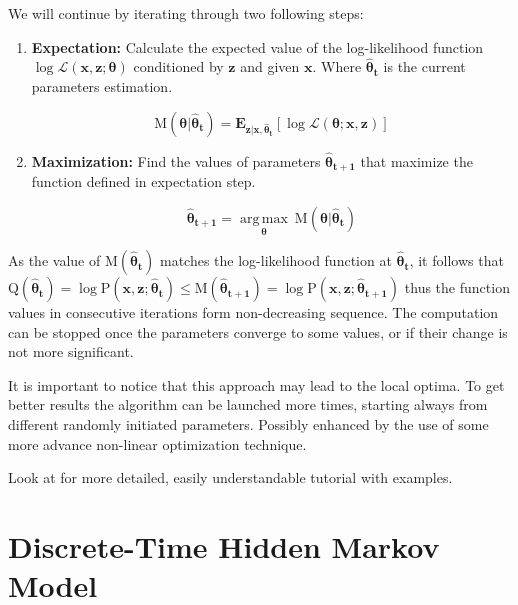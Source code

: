 \documentclass[thesis=M,english]{FITthesis}[2012/10/20]
\newcommand{\matr}[1]{\mathbf{#1}}
\begin{document}
We will continue by iterating through two following steps: 

\begin{enumerate}[resume]
\item \textbf{Expectation:} Calculate the expected value of the log-likelihood function $\log\mathcal{L}(\mathbf{x},\mathbf{z}; \boldsymbol{\theta})$ conditioned by $\matr{z}$ and given $\matr{x}$. Where ${\boldsymbol{\hat \theta_{t}}}$ is the current parameters estimation.

\begin{equation}\label{eq:exp}
 \mathrm{M}(\boldsymbol\theta|\boldsymbol{ \hat \theta_{t} }) = \mathbf{E}_{\matr{z}|\matr{x},\boldsymbol{ \hat \theta_{t}}}\left[ \log \mathcal{L} (\boldsymbol\theta;\matr{x},\matr{z})  \right]
\end{equation}

\item \textbf{Maximization:} Find the values of parameters $ \boldsymbol{\hat \theta_{t+1}}$ that maximize the function defined in expectation step. 

\begin{equation}
\boldsymbol{ \hat \theta_{t+1} } = \underset{\boldsymbol\theta}{\operatorname{arg\,max}} \ \mathrm{M}(\boldsymbol\theta|\boldsymbol{ \hat \theta_{t} })
\end{equation}
\end{enumerate}  

As the value of $\mathrm{M}( \boldsymbol{ \hat \theta_{t} } )$ matches the log-likelihood function at 
$ {\boldsymbol{ \hat \theta_{t}}}$, it follows that 
$ \mathrm{Q}( \boldsymbol{\hat \theta_{t}}) =  \log \mathrm{P}(\mathbf{x},\mathbf{z}; \boldsymbol{\hat \theta_{t}}) \leq \mathrm{M}( \boldsymbol{  \hat \theta_{t+1}}) =  \log \mathrm{P}(\mathbf{x},\mathbf{z}; \boldsymbol{\hat \theta_{t+1}})$ 
thus the function values in consecutive iterations form non-decreasing sequence. The computation can be stopped once the parameters converge to some values, or if their change is not more significant.  

It is important to notice that this approach may lead to the local optima. To get better results the algorithm can be launched more times, starting always from different randomly initiated parameters. Possibly enhanced by the use of some more advance non-linear optimization technique.

Look at \cite{Do08} for more detailed, easily understandable tutorial with examples.

\section{Discrete-Time Hidden Markov Model}\label{sec:3p}
\end{document}
